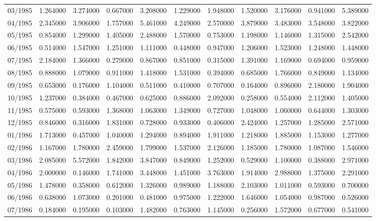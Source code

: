 \begin{tabular}{lrrrrrrrrrr}
03/1985 & 1.264000 & 3.274000 & 0.667000 & 3.208000 & 1.229000 & 1.948000 & 1.520000 & 3.176000 & 0.941000 & 5.389000 \\
04/1985 & 2.345000 & 3.906000 & 1.757000 & 5.461000 & 4.249000 & 2.570000 & 3.879000 & 3.483000 & 3.548000 & 3.822000 \\
05/1985 & 0.854000 & 1.299000 & 1.405000 & 2.488000 & 1.570000 & 0.753000 & 1.198000 & 1.146000 & 1.315000 & 2.542000 \\
06/1985 & 0.514000 & 1.547000 & 1.251000 & 1.111000 & 0.448000 & 0.947000 & 1.206000 & 1.523000 & 1.248000 & 1.448000 \\
07/1985 & 2.184000 & 1.366000 & 0.279000 & 0.867000 & 0.851000 & 0.315000 & 1.391000 & 1.169000 & 0.694000 & 0.959000 \\
08/1985 & 0.888000 & 1.079000 & 0.911000 & 1.418000 & 1.531000 & 0.394000 & 0.685000 & 1.766000 & 0.849000 & 1.134000 \\
09/1985 & 0.653000 & 0.176000 & 1.104000 & 0.511000 & 0.410000 & 0.707000 & 0.164000 & 0.896000 & 2.180000 & 1.904000 \\
10/1985 & 1.237000 & 0.384000 & 0.467000 & 0.625000 & 0.886000 & 2.092000 & 0.258000 & 0.554000 & 2.112000 & 1.405000 \\
11/1985 & 0.575000 & 0.593000 & 1.368000 & 1.063000 & 1.349000 & 0.727000 & 1.048000 & 1.060000 & 0.644000 & 1.303000 \\
12/1985 & 0.846000 & 0.316000 & 1.831000 & 0.728000 & 0.933000 & 0.406000 & 2.424000 & 1.257000 & 1.285000 & 2.571000 \\
01/1986 & 1.713000 & 0.457000 & 1.040000 & 1.294000 & 0.894000 & 1.911000 & 1.218000 & 1.885000 & 1.153000 & 1.277000 \\
02/1986 & 1.167000 & 1.780000 & 2.459000 & 1.799000 & 1.537000 & 2.126000 & 1.185000 & 1.780000 & 1.087000 & 1.546000 \\
03/1986 & 2.085000 & 5.572000 & 1.842000 & 3.847000 & 0.849000 & 1.252000 & 0.529000 & 1.100000 & 0.388000 & 2.971000 \\
04/1986 & 2.000000 & 0.146000 & 1.741000 & 3.448000 & 1.451000 & 3.763000 & 1.914000 & 2.988000 & 1.375000 & 2.291000 \\
05/1986 & 1.478000 & 0.358000 & 0.612000 & 1.326000 & 0.989000 & 1.188000 & 2.103000 & 1.011000 & 0.593000 & 0.700000 \\
06/1986 & 0.638000 & 1.073000 & 0.201000 & 0.481000 & 0.975000 & 1.222000 & 1.646000 & 1.054000 & 0.987000 & 0.526000 \\
07/1986 & 0.184000 & 0.195000 & 0.103000 & 1.482000 & 0.763000 & 1.145000 & 0.256000 & 1.572000 & 0.677000 & 0.541000 \\

\end{tabular}

